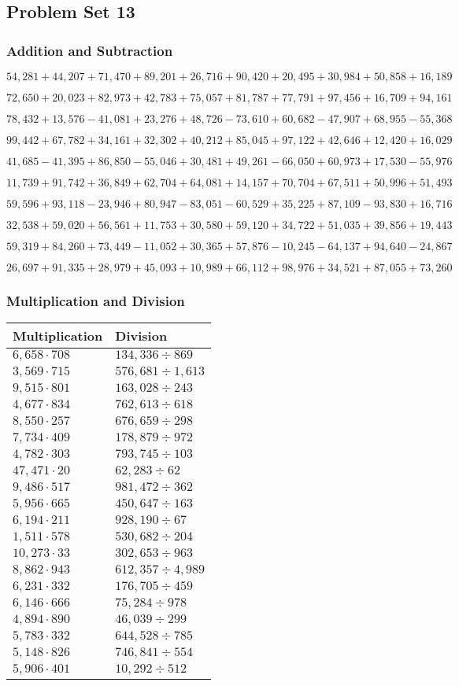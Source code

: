 \hypertarget{problem-set-13-4}{%
\subsection{Problem Set 13}\label{problem-set-13-4}}

\hypertarget{addition-and-subtraction-235}{%
\subsubsection{Addition and
Subtraction}\label{addition-and-subtraction-235}}

\(54,281+44,207+71,470+89,201+26,716+90,420+20,495+30,984+50,858+ 16,189\)

\(72,650+20,023+82,973+42,783+75,057+81,787+77,791+97,456+16,709+94,161\)

\(78,432+13,576-41,081+23,276+48,726-73,610+60,682-47,907+68,955-55,368\)

\(99,442+67,782+34,161+32,302+40,212+85,045+97,122+42,646+12,420+16,029\)

\(41,685-41,395+86,850-55,046+30,481+49,261-66,050+60,973+17,530-55,976\)

\(11,739+91,742+36,849+62,704+64,081+14,157+70,704+67,511+50,996+51,493\)

\(59,596+93,118-23,946+80,947-83,051-60,529+35,225+87,109-93,830+16,716\)

\(32,538+59,020+56,561+11,753+30,580+59,120+34,722+51,035+39,856+19,443\)

\(59,319+84,260+73,449-11,052+30,365+57,876-10,245-64,137+94,640-24,867\)

\(26,697+91,335+28,979+45,093+10,989+66,112+98,976+34,521+87,055+73,260\)

\hypertarget{multiplication-and-division-234}{%
\subsubsection{Multiplication and
Division}\label{multiplication-and-division-234}}

\begin{longtable}[]{@{}ll@{}}
\toprule
Multiplication & Division\tabularnewline
\midrule
\endhead
\(6,658\cdot708\) & \(134,336÷869\)\tabularnewline
\(3,569\cdot715\) & \(576,681÷1,613\)\tabularnewline
\(9,515\cdot801\) & \(163,028÷243\)\tabularnewline
\(4,677\cdot834\) & \(762,613÷618\)\tabularnewline
\(8,550\cdot257\) & \(676,659÷298\)\tabularnewline
\(7,734\cdot409\) & \(178,879÷972\)\tabularnewline
\(4,782\cdot303\) & \(793,745÷103\)\tabularnewline
\(47,471\cdot20\) & \(62,283÷62\)\tabularnewline
\(9,486\cdot517\) & \(981,472÷362\)\tabularnewline
\(5,956\cdot665\) & \(450,647÷163\)\tabularnewline
\(6,194\cdot211\) & \(928,190÷67\)\tabularnewline
\(1,511\cdot578\) & \(530,682÷204\)\tabularnewline
\(10,273\cdot33\) & \(302,653÷963\)\tabularnewline
\(8,862\cdot943\) & \(612,357÷4,989\)\tabularnewline
\(6,231\cdot332\) & \(176,705÷459\)\tabularnewline
\(6,146\cdot666\) & \(75,284÷978\)\tabularnewline
\(4,894\cdot890\) & \(46,039÷299\)\tabularnewline
\(5,783\cdot332\) & \(644,528÷785\)\tabularnewline
\(5,148\cdot826\) & \(746,841÷554\)\tabularnewline
\(5,906\cdot401\) & \(10,292÷512\)\tabularnewline
\bottomrule
\end{longtable}

